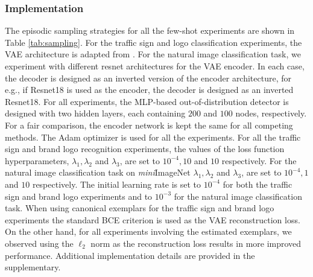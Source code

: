 


\subsubsection*{Implementation} 
The episodic sampling strategies for all the few-shot experiments are shown in Table \ref{tab:sampling}.
For the traffic sign and logo classification experiments, the VAE architecture is adapted from \cite{kim2019variational}. For the natural image classification task, we experiment with different resnet architectures \cite{resnet18} for the VAE encoder. In each case, the decoder is designed as an inverted version of the encoder architecture, for e.g., if Resnet18 \cite{resnet18} is used as the encoder, the decoder is designed as an inverted Resnet18. For all experiments, the MLP-based out-of-distribution detector is designed with two hidden layers, each containing $200$ and $100$ nodes, respectively. For a fair comparison, the encoder network is kept the same for all competing methods. The Adam optimizer \cite{kingma2017adam} is used for all the experiments. For all the traffic sign and brand logo recognition experiments, the values of the loss function hyperparameters, $\lambda_1,\lambda_2$ and $\lambda_3$, are set to $10^{-4},10$ and $10$ respectively. For the natural image classification task on \textit{mini}ImageNet $\lambda_1,\lambda_2$ and $\lambda_3$, are set to $10^{-4},1$ and $10$ respectively. The initial learning rate is set to $10^{-4}$ for both the traffic sign and brand logo experiments and to $10^{-3}$ for the natural image classification task. When using canonical exemplars for   the traffic sign and brand logo experiments the standard BCE criterion is used as the VAE reconstruction loss. On the other hand, for all experiments involving the estimated exemplars, we observed  using the $\ell_2$ norm as the reconstruction loss results in more improved performance. Additional implementation details are provided in the supplementary.

